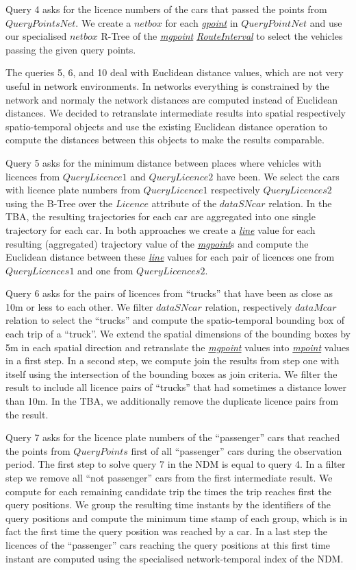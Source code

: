 \documentclass[a4paper]{article}
\newcommand{\dt}[1]{\textsl{\underline{#1}}}
\begin{document}
Query 4 asks for the licence numbers of the cars that passed the points
from $QueryPointsNet$. We create a $netbox$ for each \dt{gpoint} in $QueryPointNet$
and use our specialised $netbox$ R-Tree of the \dt{mgpoint} \dt{RouteInterval} to
select the vehicles passing the given query points.

The queries 5, 6, and 10 deal with Euclidean distance values, which are not very
useful in network environments. In networks everything is constrained by the
network and normaly the network distances are computed instead of Euclidean
distances. We decided to retranslate intermediate results
into spatial respectively spatio-temporal objects and use the existing
Euclidean distance operation to compute the distances between this objects to make
the results comparable.

Query 5 asks for the minimum distance between places where vehicles with
licences from $QueryLicence1$ and $QueryLicence2$ have been. We select the cars
with licence plate numbers from $QueryLicence1$ respectively $QueryLicences2$ using the
B-Tree over the $Licence$ attribute of the $dataSNcar$ relation. In the TBA, the
resulting trajectories for each car are aggregated into one single trajectory
for each car. In both approaches we create a \dt{line} value for each resulting
(aggregated) trajectory value of the \dt{mgpoint}s and compute the Euclidean distance
between these \dt{line} values for each pair of licences one from $QueryLicences1$ and one
from $QueryLicences2$.

Query 6 asks for the pairs of licences from ``trucks'' that have been as close as
10m or less to each other. We filter $dataSNcar$ relation, respectively $dataMcar$
relation to select the ``trucks'' and compute the spatio-temporal bounding box
of each trip of a ``truck''. We extend the spatial dimensions of the bounding boxes
by 5m in each spatial direction and retranslate the \dt{mgpoint} values into \dt{mpoint}
values in a first step. In a second step, we compute join the results from
step one with itself using the intersection of the bounding boxes as join criteria.
We filter the result to include all licence pairs of ``trucks'' that had sometimes
a distance lower than 10m. In the TBA, we additionally remove the duplicate licence
pairs from the result.

Query 7 asks for the licence plate numbers of the ``passenger'' cars that reached
the points from $QueryPoints$ first of all ``passenger'' cars during the
observation period. The first step to solve query 7 in the NDM is
equal to query 4. In a filter step we remove all ``not passenger'' cars from the
first intermediate result. We compute for each remaining candidate trip the times
the trip reaches first the query positions. We group the resulting time instants
by the identifiers of the query positions and compute the minimum time stamp of
each group, which is in fact the first time the query position was reached by a
car. In a last step the licences of the ``passenger'' cars reaching the query
positions at this first time instant are computed using the specialised
network-temporal index of the NDM.
\end{document}

